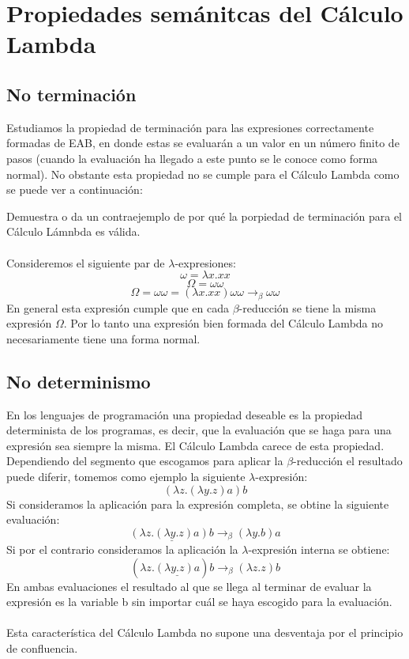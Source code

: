         \section{Propiedades semánitcas del Cálculo Lambda}

                \subsection{No terminación}
                    Estudiamos la propiedad de terminación para las expresiones correctamente formadas de \textsf{EAB}, en donde estas se evaluarán a un valor en un número finito de pasos (cuando la evaluación ha llegado a este punto se le conoce como forma normal). 
                    No obstante esta propiedad no se cumple para el Cálculo Lambda como se puede ver a continuación:
                    \begin{exercise}
                        Demuestra o da un contraejemplo de por qué la porpiedad de terminación para el Cálculo Lámnbda es válida.\\\\
                        Consideremos el siguiente par de $\lambda$-expresiones:\\
                        $$ \omega = \lambda x.xx$$
                        $$ \Omega = \omega \omega$$
                        $$ \Omega = \omega \omega = (\lambda x.xx) \omega \omega \rightarrow_\beta \omega \omega$$
                        En general esta expresión cumple que en cada $\beta$-reducción se tiene la misma expresión $\Omega$.
                        Por lo tanto una expresión bien formada del Cálculo Lambda no necesariamente tiene una forma normal.
                    \end{exercise}

                \subsection{No determinismo}
                    En los lenguajes de programación una propiedad deseable es la propiedad determinista de los programas, es decir, que la evaluación que se haga para una expresión sea siempre la misma. El Cálculo Lambda carece de esta propiedad. Dependiendo del segmento que escogamos para aplicar la $\beta$-reducción el resultado puede diferir, tomemos como ejemplo la siguiente $\lambda$-expresión:
                    $$(\lambda z.(\lambda y.z)a)b$$
                    Si consideramos la aplicación para la expresión completa, se obtine la siguiente evaluación: $$\underline{(\lambda z.(\lambda y.z)a)b} \rightarrow_\beta (\lambda y.b)a$$
                    Si por el contrario consideramos la aplicación la $\lambda$-expresión interna se obtiene: $$(\lambda z.\underline{(\lambda y.z)a})b \rightarrow_\beta (\lambda z.z)b$$
                    En ambas evaluaciones el resultado al que se llega al terminar de evaluar la expresión es la variable b sin importar cuál se haya escogido para la evaluación.\\\\
                    Esta característica del Cálculo Lambda no supone una desventaja por el principio de confluencia.

